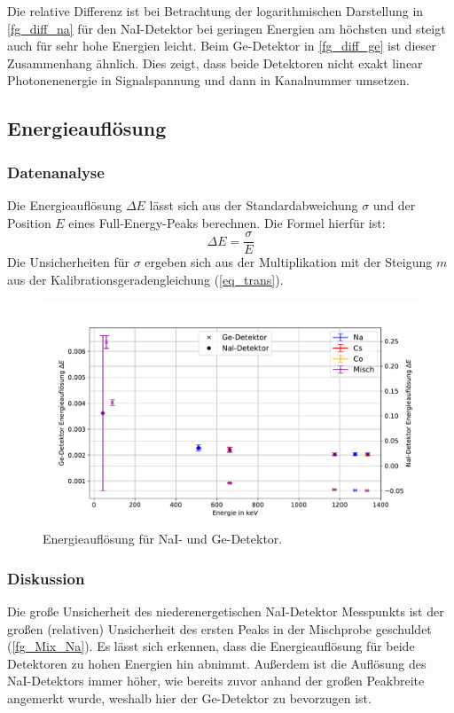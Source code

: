 \documentclass[
	a4paper,
	12pt,
	pagesize,
	ngerman
]{scrartcl}
\begin{document}
	Die relative Differenz ist bei Betrachtung der logarithmischen Darstellung in \cref{fg_diff_na} für den NaI-Detektor bei geringen Energien am höchsten und steigt auch für sehr hohe Energien leicht.
	Beim Ge-Detektor in \cref{fg_diff_ge} ist dieser Zusammenhang ähnlich.
	Dies zeigt, dass beide Detektoren nicht exakt linear Photonenenergie in Signalspannung und dann in Kanalnummer umsetzen.

\subsection{Energieauflösung}
\subsubsection{Datenanalyse}
Die Energieauflösung $\Delta E$ lässt sich aus der Standardabweichung $\sigma$ und der Position $E$ eines Full-Energy-Peaks berechnen.
Die Formel hierfür ist:
\begin{equation}
	\Delta E = \frac{\sigma}{E}
\end{equation}
Die Unsicherheiten für $\sigma$ ergeben sich aus der Multiplikation mit der Steigung $m$ aus der Kalibrationsgeradengleichung (\ref{eq_trans}).


	\begin{figure}[H]
			\includegraphics[width= 1 \linewidth]{img/res}
			\caption{
			Energieauflösung für NaI- und Ge-Detektor.
			}
			\label{fg_resolution}
	\end{figure}


\subsubsection{Diskussion}

Die große Unsicherheit des niederenergetischen NaI-Detektor Messpunkts ist der großen (relativen) Unsicherheit des ersten Peaks in der Mischprobe geschuldet (\cref{fg_Mix_Na}).
Es lässt sich erkennen, dass die Energieauflösung für beide Detektoren zu hohen Energien hin abnimmt.
Außerdem ist die Auflösung des NaI-Detektors immer höher, wie bereits zuvor anhand der großen Peakbreite angemerkt wurde, weshalb hier der Ge-Detektor zu bevorzugen ist.
\end{document}
